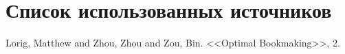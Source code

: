 \chapter*{Список использованных источников}

\begingroup
\renewcommand{\section}[2]{}
\begin{thebibliography}{}
	Lorig, Matthew and Zhou, Zhou and Zou, Bin. <<Optimal Bookmaking>>, 2.
\end{thebibliography}
\endgroup

\pagebreak